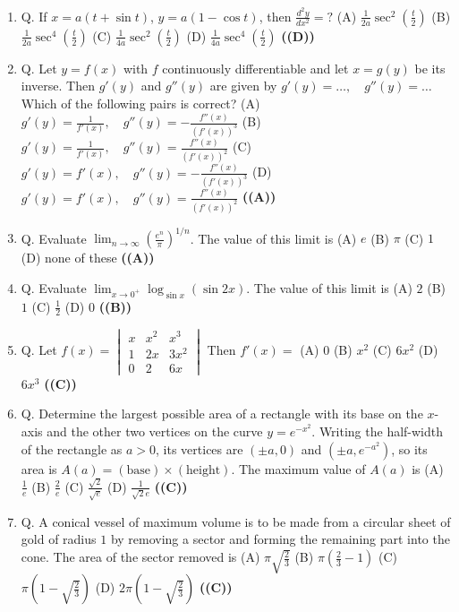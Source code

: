 \documentclass{article}
\begin{document}
\begin{enumerate}
(A) $x^3 - 5x^2 + 2x + 6$
(B) $x^3 + 3x^2 - 4x + 6$
(C) $x^3 - 6x^2 + 3x + 1$
(D) $x^3 - x^2 + x - 1$ \hfill \textbf{((A))}
\item Q. If
$x = a(t + \sin t)$, $y = a(1-\cos t)$,
then $\frac{d^2y}{dx^2} =?$
(A) $\frac{1}{2a} \sec^2(\frac{t}{2})$
(B) $\frac{1}{2a} \sec^4(\frac{t}{2})$
(C) $\frac{1}{4a} \sec^2(\frac{t}{2})$
(D) $\frac{1}{4a} \sec^4(\frac{t}{2})$ \hfill \textbf{((D))}
\item Q. Let $y = f(x)$ with $f$ continuously differentiable and let $x = g(y)$ be its inverse. Then
$g'(y)$ and $g''(y)$ are given by
$g'(y) = \ldots, \quad g''(y) = \ldots$
Which of the following pairs is correct?
(A) $g'(y) = \frac{1}{f'(x)}, \quad g''(y) = -\frac{f''(x)}{(f'(x))^3}$
(B) $g'(y) = \frac{1}{f'(x)}, \quad g''(y) = \frac{f''(x)}{(f'(x))^2}$
(C) $g'(y) = f'(x), \quad g''(y) = -\frac{f''(x)}{(f'(x))^3}$
(D) $g'(y) = f'(x), \quad g''(y) = \frac{f''(x)}{(f'(x))^2}$ \hfill \textbf{((A))}
\item Q. Evaluate
$\lim_{n\to\infty} \left(\frac{e^n}{\pi}\right)^{1/n}$.
The value of this limit is
(A) $e$
(B) $\pi$
(C) $1$
(D) none of these \hfill \textbf{((A))}
\item Q. Evaluate
$\lim_{x\to0^+} \log_{\sin x} (\sin 2x)$.
The value of this limit is
(A) $2$
(B) $1$
(C) $\frac{1}{2}$
(D) $0$ \hfill \textbf{((B))}
\item Q. Let
$f(x) = \begin{vmatrix} x & x^2 & x^3 \\ 1 & 2x & 3x^2 \\ 0 & 2 & 6x \end{vmatrix}$
Then $f'(x) =$
(A) $0$
(B) $x^2$
(C) $6x^2$
(D) $6x^3$ \hfill \textbf{((C))}
\item Q. Determine the largest possible area of a rectangle with its base on the $x$-axis and the
other two vertices on the curve $y = e^{-x^2}$. Writing the half-width of the rectangle as $a > 0$,
its vertices are $(\pm a, 0)$ and $(\pm a, e^{-a^2})$, so its area is
$A(a) = (\text{base}) \times (\text{height})$.
The maximum value of $A(a)$ is
(A) $\frac{1}{e}$
(B) $\frac{2}{e}$
(C) $\frac{\sqrt{2}}{\sqrt{e}}$
(D) $\frac{1}{\sqrt{2}e}$ \hfill \textbf{((C))}
\item Q. A conical vessel of maximum volume is to be made from a circular sheet of gold of radius
$1$ by removing a sector and forming the remaining part into the cone. The area of the sector
removed is
(A) $\pi \sqrt{\frac{2}{3}}$
(B) $\pi (\frac{2}{3}-1)$
(C) $\pi(1 - \sqrt{\frac{2}{3}})$
(D) $2\pi (1 - \sqrt{\frac{2}{3}})$ \hfill \textbf{((C))}

\end{enumerate}
\end{document}
